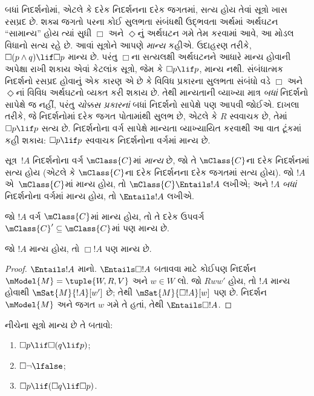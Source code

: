 \begin{explain}
  બધાં નિદર્શનોમાં, એટલે કે દરેક નિદર્શનના દરેક જગતમાં,
  સત્ય હોય તેવાં સૂત્રો ખાસ રસપ્રદ છે. શક્ય જગતો
  પરના કોઈ સુલભતા સંબંધથી ઉદ્ભવતા અર્થમાં અર્થઘટન
  ``સામાન્ય'' હોય ત્યાં સુધી $\Box$ અને $\Diamond$નું
  અર્થઘટન ગમે તેમ કરવામાં આવે, આ મોડલ વિધાનો
  સત્ય રહે છે. આવાં સૂત્રોને આપણે \emph{માન્ય} કહીએ.
  ઉદાહરણ તરીકે, $\Box(p \land q) \lif \Box p$ માન્ય છે.
  પરંતુ $\Box$ના સત્યલક્ષી અર્થઘટનને આધારે માન્ય હોવાની
  અપેક્ષા રાખી શકાય એવાં કેટલાંક સૂત્રો, જેમ કે
  $\Box p \lif p$, માન્ય નથી. સંબંધાત્મક નિદર્શનો
  રસપ્રદ હોવાનું એક કારણ એ છે કે વિવિધ પ્રકારના
  સુલભતા સંબંધો વડે $\Box$ અને $\Diamond$નાં વિવિધ
  અર્થઘટનો વ્યક્ત કરી શકાય છે. તેથી માન્યતાની વ્યાખ્યા
  માત્ર \emph{બધાં} નિદર્શનો સાપેક્ષે જ નહીં, પરંતુ
  \emph{ચોક્કસ પ્રકારનાં} બધાં નિદર્શનો સાપેક્ષે પણ
  આપવી જોઈએ. દાખલા તરીકે, જે નિદર્શનોમાં દરેક
  જગત પોતામાંથી સુલભ છે, એટલે કે $R$ સ્વવાચક છે,
  તેમાં $\Box p \lif p$ સત્ય છે. નિદર્શનોના વર્ગ
  સાપેક્ષે માન્યતા વ્યાખ્યાયિત કરવાથી આ વાત ટૂંકમાં
  કહી શકાય: $\Box p \lif p$ સ્વવાચક નિદર્શનોના
  વર્ગમાં માન્ય છે.
\end{explain}

\begin{defn}
  સૂત્ર~$!A$ નિદર્શનોના વર્ગ $\mClass{C}$માં
  \emph{માન્ય} છે, જો તે $\mClass{C}$ના દરેક નિદર્શનમાં
  સત્ય હોય (એટલે કે $\mClass{C}$ના દરેક નિદર્શનના
  દરેક જગતમાં સત્ય હોય). જો $!A$ એ~$\mClass{C}$માં
  માન્ય હોય, તો $\mClass{C} \Entails !A$ લખીએ;
  અને $!A$ \emph{બધાં} નિદર્શનોના વર્ગમાં માન્ય હોય,
  તો $\Entails !A$ લખીએ.
\end{defn}

\begin{prop}
  જો $!A$ વર્ગ $\mClass{C}$માં માન્ય હોય, તો તે દરેક
  ઉપવર્ગ $\mClass{C}' \subseteq \mClass{C}$માં પણ માન્ય છે.
\end{prop}

\begin{prop}
  જો $!A$ માન્ય હોય, તો $\Box!A$ પણ માન્ય છે.
\end{prop}

\begin{proof}
  $\Entails !A$ માનો. $\Entails \Box!A$ બતાવવા માટે
  કોઈપણ નિદર્શન $\mModel{M} =
  \tuple{W, R, V}$ અને $w \in W$ લો. જો $Rww'$ હોય,
  તો $!A$ માન્ય હોવાથી $\mSat{M}{!A}[w']$ છે;
  તેથી $\mSat{M}{\Box!A}[w]$ પણ છે. નિદર્શન
  $\mModel{M}$ અને જગત $w$ ગમે તે હતાં, તેથી
  $\Entails \Box!A$.
\end{proof}

\begin{prob}
  નીચેના સૂત્રો માન્ય છે તે બતાવો:
  \begin{enumerate}
  \item $\Box p \lif \Box (q \lif p)$;
  \item $\Box \lnot \lfalse$;
  \item $\Box p \lif (\Box q \lif \Box p)$.
  \end{enumerate}
\end{prob}


